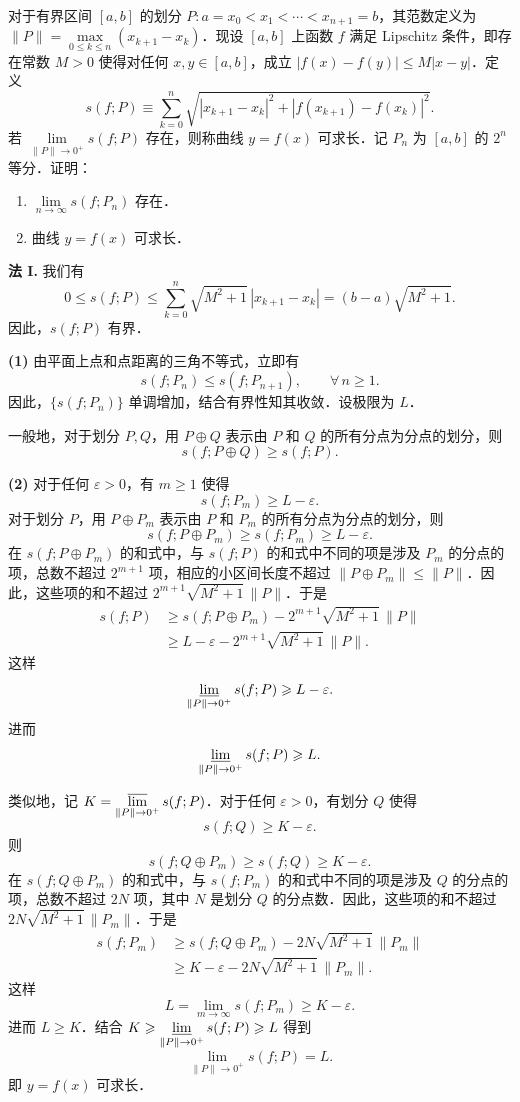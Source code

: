 对于有界区间 $[a,b]$ 的划分 $P:a=x_0<x_1<\cdots<x_{n+1}=b$，其范数定义为 $\|P\|=\max\limits_{0\leqslant k\leqslant n}(x_{k+1}-x_k)$．现设 $[a,b]$ 上函数 $f$ 满足 Lipschitz 条件，即存在常数 $M>0$ 使得对任何 $x,y\in[a,b]$，成立 $|f(x)-f(y)|\leqslant M|x-y|$．定义
\[
  s(f;P)\equiv\sum_{k=0}^{n}\sqrt{|x_{k+1}-x_k|^2+|f(x_{k+1})-f(x_k)|^2}.
\]
若 $\lim\limits_{\|P\|\to 0^+}s(f;P)$ 存在，则称曲线 $y=f(x)$ 可求长．记 $P_n$ 为 $[a,b]$ 的 $2^n$ 等分．证明：
\begin{enumerate}
  \item $\lim\limits_{n\to\infty}s(f;P_n)$ 存在．
  \item 曲线 $y=f(x)$ 可求长．
\end{enumerate}
\begin{solution}
\textbf{法 I.} 我们有
\[
  0\leqslant s(f;P)\leqslant\sum_{k=0}^{n}\sqrt{M^2+1}\,|x_{k+1}-x_k|=(b-a)\sqrt{M^2+1}.
\]
因此，$s(f;P)$ 有界．

\textbf{(1)} 由平面上点和点距离的三角不等式，立即有
\[
  s(f;P_n)\leqslant s(f;P_{n+1}),\qquad \forall\, n\geqslant 1.
\]
因此，$\{s(f;P_n)\}$ 单调增加，结合有界性知其收敛．设极限为 $L$．

一般地，对于划分 $P,Q$，用 $P\oplus Q$ 表示由 $P$ 和 $Q$ 的所有分点为分点的划分，则
\[
  s(f;P\oplus Q)\geqslant s(f;P).
\]

\textbf{(2)} 对于任何 $\varepsilon>0$，有 $m\geqslant 1$ 使得
\[
  s(f;P_m)\geqslant L-\varepsilon.
\]
对于划分 $P$，用 $P\oplus P_m$ 表示由 $P$ 和 $P_m$ 的所有分点为分点的划分，则
\[
  s(f;P\oplus P_m)\geqslant s(f;P_m)\geqslant L-\varepsilon.
\]
在 $s(f;P\oplus P_m)$ 的和式中，与 $s(f;P)$ 的和式中不同的项是涉及 $P_m$ 的分点的项，总数不超过 $2^{m+1}$ 项，相应的小区间长度不超过 $\|P\oplus P_m\|\leqslant\|P\|$．因此，这些项的和不超过 $2^{m+1}\sqrt{M^2+1}\,\|P\|$．于是
\begin{align*}
s(f;P)&\geqslant s(f;P\oplus P_m)-2^{m+1}\sqrt{M^2+1}\,\|P\|\\
&\geqslant L-\varepsilon-2^{m+1}\sqrt{M^2+1}\,\|P\|.
\end{align*}
这样
\[
  \varliminf_{\|P\|\to 0^+}s(f;P)\geqslant L-\varepsilon.
\]
进而
\[
  \varliminf_{\|P\|\to 0^+}s(f;P)\geqslant L.
\]

类似地，记 $K=\varlimsup\limits_{\|P\|\to 0^+}s(f;P)$．对于任何 $\varepsilon>0$，有划分 $Q$ 使得
\[
  s(f;Q)\geqslant K-\varepsilon.
\]
则
\[
  s(f;Q\oplus P_m)\geqslant s(f;Q)\geqslant K-\varepsilon.
\]
在 $s(f;Q\oplus P_m)$ 的和式中，与 $s(f;P_m)$ 的和式中不同的项是涉及 $Q$ 的分点的项，总数不超过 $2N$ 项，其中 $N$ 是划分 $Q$ 的分点数．因此，这些项的和不超过 $2N\sqrt{M^2+1}\,\|P_m\|$．于是
\begin{align*}
s(f;P_m)&\geqslant s(f;Q\oplus P_m)-2N\sqrt{M^2+1}\,\|P_m\|\\
&\geqslant K-\varepsilon-2N\sqrt{M^2+1}\,\|P_m\|.
\end{align*}
这样
\[
  L=\lim_{m\to\infty}s(f;P_m)\geqslant K-\varepsilon.
\]
进而 $L\geqslant K$．结合 $K\geqslant\varliminf\limits_{\|P\|\to 0^+}s(f;P)\geqslant L$ 得到
\[
  \lim_{\|P\|\to 0^+}s(f;P)=L.
\]
即 $y=f(x)$ 可求长．


\end{solution}
